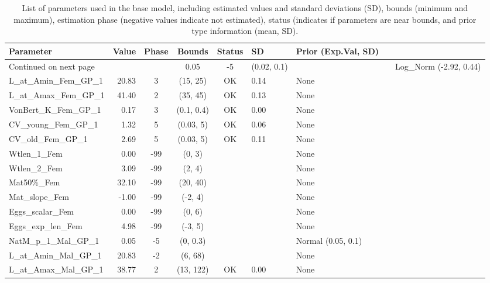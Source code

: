 \documentclass[12pt,]{article}
\begin{document}
\begin{landscape}
\begin{longtable}{lrcccll}
\caption{List of parameters used in
                                          the base model, including estimated 
                                          values and standard deviations (SD), 
                                          bounds (minimum and maximum), 
                                          estimation phase (negative values indicate
                                          not estimated), status (indicates if 
                                          parameters are near bounds, and prior type
                                          information (mean, SD).} \\ 
  \hline
Parameter & Value & Phase & Bounds & Status & SD & Prior (Exp.Val, SD)  \\ 
  \hline 
\endhead 
\hline 
\multicolumn{3}{l}{\footnotesize Continued on next page} 
\endfoot 
\endlastfoot 
 \hline
NatM\_p\_1\_Fem\_GP\_1 & 0.05 & -5 & (0.02, 0.1) &  &  & Log\_Norm (-2.92, 0.44) \\ 
  L\_at\_Amin\_Fem\_GP\_1 & 20.83 & 3 & (15, 25) & OK & 0.14 & None \\ 
  L\_at\_Amax\_Fem\_GP\_1 & 41.40 & 2 & (35, 45) & OK & 0.13 & None \\ 
  VonBert\_K\_Fem\_GP\_1 & 0.17 & 3 & (0.1, 0.4) & OK & 0.00 & None \\ 
  CV\_young\_Fem\_GP\_1 & 1.32 & 5 & (0.03, 5) & OK & 0.06 & None \\ 
  CV\_old\_Fem\_GP\_1 & 2.69 & 5 & (0.03, 5) & OK & 0.11 & None \\ 
  Wtlen\_1\_Fem & 0.00 & -99 & (0, 3) &  &  & None \\ 
  Wtlen\_2\_Fem & 3.09 & -99 & (2, 4) &  &  & None \\ 
  Mat50\%\_Fem & 32.10 & -99 & (20, 40) &  &  & None \\ 
  Mat\_slope\_Fem & -1.00 & -99 & (-2, 4) &  &  & None \\ 
  Eggs\_scalar\_Fem & 0.00 & -99 & (0, 6) &  &  & None \\ 
  Eggs\_exp\_len\_Fem & 4.98 & -99 & (-3, 5) &  &  & None \\ 
  NatM\_p\_1\_Mal\_GP\_1 & 0.05 & -5 & (0, 0.3) &  &  & Normal (0.05, 0.1) \\ 
  L\_at\_Amin\_Mal\_GP\_1 & 20.83 & -2 & (6, 68) &  &  & None \\ 
  L\_at\_Amax\_Mal\_GP\_1 & 38.77 & 2 & (13, 122) & OK & 0.00 & None \\ 

\end{longtable}
\end{landscape}
\end{document}
